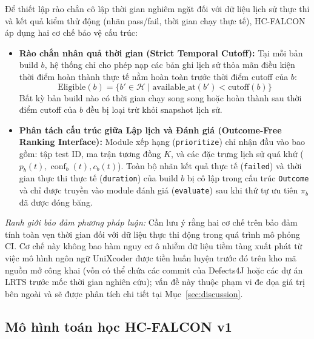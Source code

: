 Để thiết lập rào chắn cô lập thời gian nghiêm ngặt đối với dữ liệu lịch sử thực thi và kết quả kiểm thử động (nhãn pass/fail, thời gian chạy thực tế), HC-FALCON áp dụng hai cơ chế bảo vệ cấu trúc:
\begin{itemize}
    \item \textbf{Rào chắn nhân quả thời gian (Strict Temporal Cutoff):}
    Tại mỗi bản build $b$, hệ thống chỉ cho phép nạp các bản ghi lịch sử thỏa mãn điều kiện thời điểm hoàn thành thực tế nằm hoàn toàn trước thời điểm cutoff của $b$:
    \begin{equation}
    \text{Eligible}(b) = \{b' \in \mathcal{H} \mid \text{available\_at}(b') < \text{cutoff}(b)\}
    \end{equation}
    Bất kỳ bản build nào có thời gian chạy song song hoặc hoàn thành sau thời điểm cutoff của $b$ đều bị loại trừ khỏi snapshot lịch sử.
    
    \item \textbf{Phân tách cấu trúc giữa Lập lịch và Đánh giá (Outcome-Free Ranking Interface):}
    Module xếp hạng (\texttt{prioritize}) chỉ nhận đầu vào bao gồm: tập test ID, ma trận tương đồng $K$, và các đặc trưng lịch sử quá khứ ($p_b(t), \operatorname{conf}_b(t), c_b(t)$). Toàn bộ nhãn kết quả thực tế (\texttt{failed}) và thời gian thực thi thực tế (\texttt{duration}) của build $b$ bị cô lập trong cấu trúc \texttt{Outcome} và chỉ được truyền vào module đánh giá (\texttt{evaluate}) sau khi thứ tự ưu tiên $\pi_b$ đã được đóng băng.
\end{itemize}

\textit{Ranh giới bảo đảm phương pháp luận:} Cần lưu ý rằng hai cơ chế trên bảo đảm tính toàn vẹn thời gian đối với dữ liệu thực thi động trong quá trình mô phỏng CI. Cơ chế này không bao hàm nguy cơ ô nhiễm dữ liệu tiềm tàng xuất phát từ việc mô hình ngôn ngữ UniXcoder được tiền huấn luyện trước đó trên kho mã nguồn mở công khai (vốn có thể chứa các commit của Defects4J hoặc các dự án LRTS trước mốc thời gian nghiên cứu); vấn đề này thuộc phạm vi đe dọa giá trị bên ngoài và sẽ được phân tích chi tiết tại Mục~\ref{sec:discussion}.

\subsection{Mô hình toán học HC-FALCON v1}
\label{subsec:math_model_v1}

